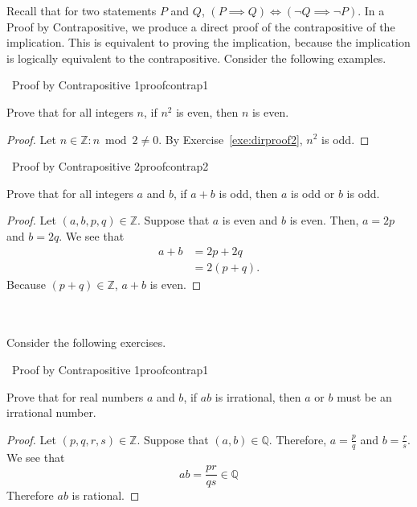     Recall that for two statements \(P\) and \(Q\), \((P\implies Q)\iff(\neg Q\implies \neg P)\). In a Proof by Contrapositive, we produce a direct proof of the contrapositive of the implication. This is equivalent to proving the implication, because the implication is logically equivalent to the contrapositive. Consider the following examples.
    \begin{example}{\Difficulty\,\Difficulty\,\,Proof by Contrapositive 1}{proofcontrap1}
    
    Prove that for all integers \(n\), if \(n^2\) is even, then \(n\) is even.
    
    \begin{proof}
        Let \(n\in\mathbb{Z}:n\bmod2\neq0\). By Exercise~\ref{exe:dirproof2}, \(n^2\) is odd.
    \end{proof}
    
    \end{example}
    \begin{example}{\Difficulty\,\Difficulty\,\,Proof by Contrapositive 2}{proofcontrap2}
    
    Prove that for all integers \(a\) and \(b\), if \(a+b\) is odd, then \(a\) is odd or \(b\) is odd.
    
    \begin{proof}
        Let \((a, b,p,q)\in\mathbb{Z}\). Suppose that \(a\) is even and \(b\) is even. Then, \(a=2p\) and \(b=2q\). We see that
        \begin{align*}
            a+b&=2p+2q \\
            &=2(p+q).
        \end{align*}
        Because \((p+q)\in\mathbb{Z}\), \(a+b\) is even.
    \end{proof}
    
    \end{example}
    \vphantom
    \\
    \\
    Consider the following exercises.
    \begin{exercise}{\Difficulty\,\Difficulty\,\,Proof by Contrapositive 1}{proofcontrap1}
    
    Prove that for real numbers \(a\) and \(b\), if \(ab\) is irrational, then \(a\) or \(b\) must be an irrational number.
    
    \begin{proof}
        Let \((p,q,r,s)\in\mathbb{Z}\). Suppose that \((a,b)\in\mathbb{Q}\). Therefore, \(a=\frac{p}{q}\) and \(b=\frac{r}{s}\). We see that
        \begin{equation*}
            ab=\frac{pr}{qs}\in\mathbb{Q}
        \end{equation*}
        Therefore \(ab\) is rational.
    \end{proof}
    
    \end{exercise}
